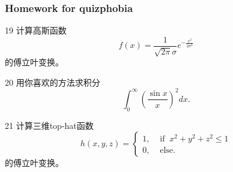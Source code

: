 \documentclass[CJK,13pt]{beamer}
\begin{document}
\begin{frame}
  \frametitle{Homework for quizphobia}
  
  \bitem
\item[19]{计算高斯函数$$f(x) = \frac{1}{\sqrt{2\pi}\sigma} e^{-\frac{x^2}{2\sigma^2}}$$
的傅立叶变换。}
\item[20]{用你喜欢的方法求积分
  $$\int_0^\infty \left(\frac{\sin x}{x}\right)^2dx . $$}
\item[21]{计算三维top-hat函数
  \begin{equation}
    h(x,y,z) = \left\{
    \begin{array}{ll}
      1, & \text{ if }\ x^2+y^2+z^2 \le 1 \\
      0, & \text{ else.}
    \end{array}
    \right. \nonumber
  \end{equation}
  的傅立叶变换。}  
  \eitem
  
\end{frame}


\ech
\end{document}
